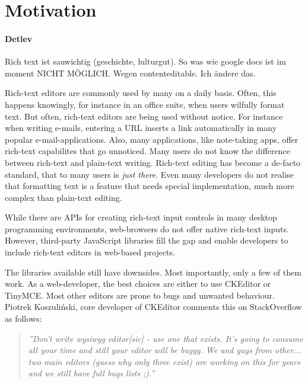 \section{Motivation}

\paragraph{Detlev} Rich text ist sauwichtig (geschichte, lulturgut). So was wie google docs ist im moment NICHT MÖGLICH. Wegen contenteditable. Ich ändere das.


Rich-text editors are commonly used by many on a daily basis. Often, this happens knowingly, for instance in an office suite, when users wilfully format text. But often, rich-text editors are being used without notice. For instance when writing e-mails, entering a URL inserts a link automatically in many popular e-mail-applications. Also, many applications, like note-taking apps, offer rich-text capabilites that go unnoticed. Many users do not know the difference between rich-text and plain-text writing. Rich-text editing has become a de-facto standard, that to many users is \textit{just there}. Even many developers do not realise that formatting text is a feature that needs special implementation, much more complex than plain-text editing.

While there are APIs for creating rich-text input controls in many desktop programming environments, web-browsers do not offer native rich-text inputs. However, third-party JavaScript libraries fill the gap and enable developers to include rich-text editors in web-based projects.

The libraries available still have downsides. Most importantly, only a few of them work. As a web-developer, the best choices are either to use CKEditor or TinyMCE. Most other editors are prone to bugs and unwanted behaviour. Piotrek Koszuli\'{n}ski, core developer of CKEditor comments this on StackOverflow as follows:

\begin{quotation}
\textit{''Don't write wysiwyg editor[sic] - use one that exists. It's going to consume all your time and still your editor will be buggy. We and guys from other... two main editors (guess why only three exist) are working on this for years and we still have full bugs lists ;).\cite{sopp}''}
\end{quotation} %

